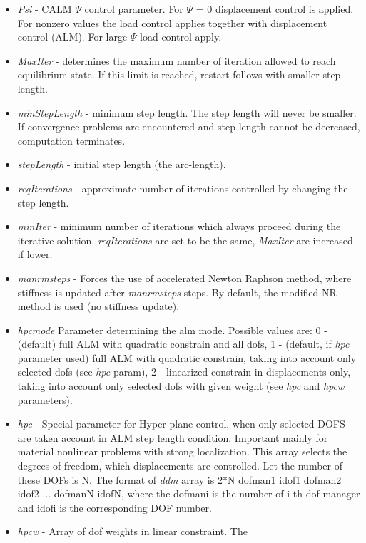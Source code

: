 \documentclass[a4paper]{article}
\newcommand{\param}[1]{{\em #1}}
\begin{document}
\begin{itemize}
\item \param{Psi} - CALM $\Psi$ control parameter. For $\Psi$ = 0
displacement control is applied. For nonzero values the load control
applies together with displacement control (ALM). For large $\Psi$
load control apply.
\item \param{MaxIter} - determines the maximum number of iteration allowed to
reach equilibrium state. If this limit is reached, restart follows
with smaller step length.
\item \param{min\-Step\-Le\-ngth} - minimum step length. The step length will never be
smaller. If convergence problems are encountered and step length cannot
be decreased, computation terminates.
\item \param{stepLength} - initial step length (the arc-length).
\item \param{reqIterations} - approximate number of iterations controlled by changing the step length.
\item \param{minIter} - minimum number of iterations which always proceed during the iterative solution. \param{reqIterations} are set to be the same, \param{MaxIter} are increased if lower.
\item \param{manrmsteps} - Forces the use of accelerated
Newton Raphson met\-hod, where stiffness is updated after
\param{manrmsteps} steps. By default, the modified NR
method is used (no stiffness update).
\item \param{hpcmode} Parameter determining the alm mode.
Possible values are: 0 - (default) full ALM with quadratic constrain and
all dofs, 1 - (default, if \param{hpc} parameter used) full ALM with quadratic constrain, taking into account
only selected dofs (see \param{hpc} param), 2 - linearized constrain
in displacements only, taking into account only selected dofs with
given weight (see \param{hpc} and \param{hpcw} parameters).
\item \param{hpc} - Special parameter for Hyper-plane control, when only
selected DOFS are taken account in ALM step length
condition. Important mainly for material nonlinear problems with
strong localization. This array selects the degrees of freedom,
which displacements are controlled. Let the number of these DOFs is N.
The format of \param{ddm} array is 2*N dofman1 idof1
dofman2 idof2 ... dofmanN idofN, where the dofmani is the number of i-th dof manager  and idofi is the
corresponding DOF number.
\item \param{hpcw} - Array of dof weights in linear constraint. The

\end{itemize}
\end{document}
